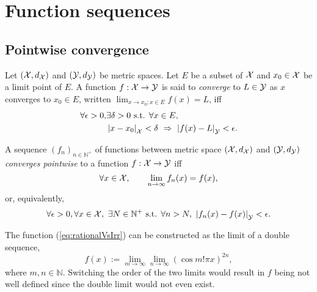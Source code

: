 \section{Function sequences}
\label{sec:uniform-convergence}

\subsection{Pointwise convergence}

\begin{defn}
  \label{def:limitingValueOfAfunc}
  Let $({\cal X}, d_{{\cal X}})$
   and $({\cal Y}, d_{{\cal Y}})$ be metric spaces.
  Let $E$ be a subset of ${\cal X}$
   and $x_0\in {\cal X}$ be a limit point of $E$.
  A function $f:{\cal X}\rightarrow {\cal Y}$
   is said to \emph{converge} to $L\in {\cal Y}$
   as $x$ converges to $x_0\in E$,
   written
     $\lim_{x\rightarrow x_0; x\in E} f(x) = L$,
   iff
   \begin{align}
     \nonumber
     \forall \epsilon>0, &\exists \delta>0 \text{ s.t. }
     \forall x\in E,\ 
     \\      \label{eq:limitingValueOfAfuncCond}
     &\left|x-x_0\right|_{{\cal X}} < \delta
      \ \Rightarrow\ 
     \left|f(x)- L\right|_{{\cal Y}} < \epsilon.
   \end{align}
\end{defn}

\begin{defn}
  \label{def:pointwiseConvergence}
  A sequence $(f_n)_{n\in\mathbb{N}^+}$ of functions 
   between metric space $({\cal X}, d_{{\cal X}})$
   and $({\cal Y}, d_{{\cal Y}})$
   \emph{converges pointwise}
   to a function $f:{\cal X}\rightarrow{\cal Y}$ iff
   \begin{equation}
     \label{eq:pointwiseConvergence1}
     \forall x\in {\cal X},\qquad
     \lim_{n\rightarrow \infty} f_n(x) =  f(x),
   \end{equation}
   or, equivalently, 
   \begin{equation}
     \label{eq:pointwiseConvergence2}
     \forall \epsilon>0, 
      \forall x\in {\cal X},\ 
       \exists N\in \mathbb{N}^+ \text{ s.t. } \forall n>N,\ 
       \left|f_n(x)- f(x)\right|_{{\cal Y}} < \epsilon.
   \end{equation}
\end{defn}

\begin{exm}
  The function (\ref{eq:rationalVsIrr}) can be constructed
  as the limit of a double sequence, 
  \begin{equation}
    \label{eq:construcRatVsIrrat}
    f(x) := \lim_{m\rightarrow \infty} \lim_{n\rightarrow \infty}
    (\cos m!\pi x)^{2n}, 
  \end{equation}
  where $m,n\in \mathbb{N}$.
  Switching the order of the two limits 
  would result in $f$ being not well defined
  since the double limit would not even exist.
\end{exm}

